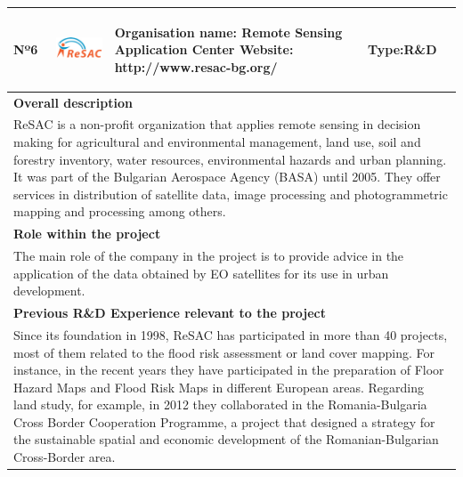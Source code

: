 \begin{longtable}[H]{|p{0.7cm}|p{4cm}|p{7cm}|p{1.3cm}|}
	\hline
	\begin{center} Nº6 \end{center} & \begin{center} \includegraphics[scale=1.2]{./logos/logo_resac} \end{center} & \begin{center} \textbf{Organisation name:} Remote Sensing Application Center \newline \textbf{Website:} http://www.resac-bg.org/ \end{center} & \begin{center} Type:\newline R\&D \end{center} \\ \hline
	
	\multicolumn{4}{|p{13cm}|}{\textbf{Overall description}}  \\ \hline
	
	\multicolumn{4}{|p{14.5cm}|}{ReSAC is a non-profit organization that applies remote sensing in decision making for agricultural and environmental management, land use, soil and forestry inventory, water resources, environmental hazards and urban planning. It was part of the Bulgarian Aerospace Agency (BASA) until 2005. They offer services in distribution of satellite data, image processing and photogrammetric mapping and processing among others.}  \\ \hline
	
	\multicolumn{4}{|p{13cm}|}{\textbf{Role within the project}}   \\ \hline
	
	\multicolumn{4}{|p{14.5cm}|}{The main role of the company in the project is to provide advice in the application of the data obtained by EO satellites for its use in urban development.}  \\ \hline
	
	\multicolumn{4}{|p{13cm}|}{\textbf{Previous R\&D Experience relevant to the project}}  \\ \hline
	
	\multicolumn{4}{|p{14.5cm}|}{Since its foundation in 1998, ReSAC has participated in more than 40 projects, most of them related to the flood risk assessment or land cover mapping. For instance, in the recent years they have participated in the preparation of Floor Hazard Maps and Flood Risk Maps in different European areas. Regarding land study, for example, in 2012 they collaborated in the Romania-Bulgaria Cross Border Cooperation Programme, a project that designed a strategy for the sustainable spatial and economic development of the Romanian-Bulgarian Cross-Border area.}  \\ \hline
	

\end{longtable}

